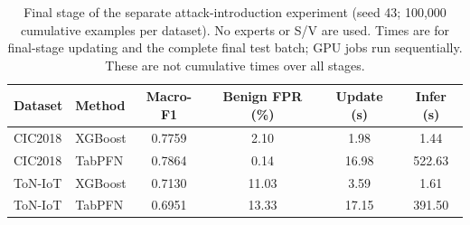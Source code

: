 \begin{table}[t]
\centering
\caption{Final stage of the separate attack-introduction experiment (seed 43; 100,000 cumulative examples per dataset). No experts or S/V are used. Times are for final-stage updating and the complete final test batch; GPU jobs run sequentially. These are not cumulative times over all stages.}
\label{tab:arrival}
\begin{tabular}{@{}ll S[table-format=1.4] S[table-format=2.2] S[table-format=2.2] S[table-format=3.2]@{}}
\toprule
Dataset & Method & {Macro-F1} & {Benign FPR (\%)} & {Update (s)} & {Infer (s)} \\
\midrule
CIC2018 & XGBoost & 0.7759 & 2.10 & 1.98 & 1.44 \\
CIC2018 & TabPFN & 0.7864 & 0.14 & 16.98 & 522.63 \\
ToN-IoT & XGBoost & 0.7130 & 11.03 & 3.59 & 1.61 \\
ToN-IoT & TabPFN & 0.6951 & 13.33 & 17.15 & 391.50 \\
\bottomrule
\end{tabular}
\end{table}
